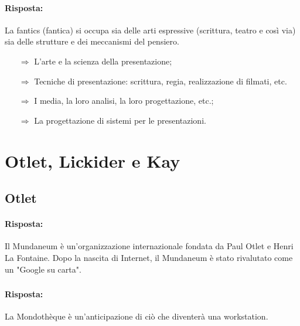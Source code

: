 
\paragraph{Risposta:} La fantics (fantica) si occupa sia delle arti espressive (scrittura, teatro e così via) sia
delle strutture e dei meccanismi del pensiero.

\begin{itemize}
    \item [$\Rightarrow$] L'arte e la scienza della presentazione;
    \item [$\Rightarrow$] Tecniche di presentazione: scrittura, regia, realizzazione di filmati, etc.
    \item [$\Rightarrow$] I media, la loro analisi, la loro progettazione, etc.;
    \item [$\Rightarrow$] La progettazione di sistemi per le presentazioni.
\end{itemize}

\section{Otlet, Lickider e Kay}

\subsection{Otlet}


\paragraph{Risposta:} Il Mundaneum è un'organizzazione internazionale fondata da Paul Otlet e Henri La Fontaine.
Dopo la nascita di Internet, il Mundaneum è stato rivalutato come un "Google su carta".

\subsubsection{}


\paragraph{Risposta:} La Mondothèque è un'anticipazione di ciò che diventerà una workstation.

